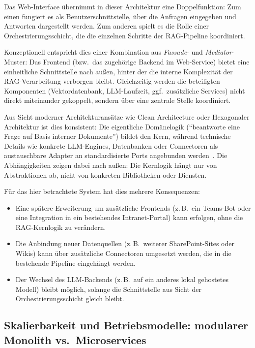Das Web-Interface übernimmt in dieser Architektur eine Doppelfunktion:
Zum einen fungiert es als Benutzerschnittstelle, über die Anfragen eingegeben und Antworten dargestellt werden.
Zum anderen spielt es die Rolle einer Orchestrierungsschicht, die die einzelnen Schritte der RAG-Pipeline koordiniert.

Konzeptionell entspricht dies einer Kombination aus \emph{Fassade}- und \emph{Mediator}-Muster:
Das Frontend (bzw.\ das zugehörige Backend im Web-Service) bietet eine einheitliche Schnittstelle nach außen, hinter der die interne Komplexität der RAG-Verarbeitung verborgen bleibt.
Gleichzeitig werden die beteiligten Komponenten (Vektordatenbank, LLM-Laufzeit, ggf.\ zusätzliche Services) nicht direkt miteinander gekoppelt, sondern über eine zentrale Stelle koordiniert.

Aus Sicht moderner Architekturansätze wie Clean Architecture oder Hexagonaler Architektur ist dies konsistent:
Die eigentliche Domänelogik (\enquote{beantworte eine Frage auf Basis interner Dokumente}) bildet den Kern, während technische Details wie konkrete LLM-Engines, Datenbanken oder Connectoren als austauschbare Adapter an standardisierte Ports angebunden werden~\cite{Martin2012CleanArchitecture,Khadapkar2025Hexagonal}.
Die Abhängigkeiten zeigen dabei nach außen: Die Kernlogik hängt nur von Abstraktionen ab, nicht von konkreten Bibliotheken oder Diensten.

Für das hier betrachtete System hat dies mehrere Konsequenzen:

\begin{itemize}
    \item Eine spätere Erweiterung um zusätzliche Frontends (z.\,B.\ ein Teams-Bot oder eine Integration in ein bestehendes Intranet-Portal) kann erfolgen, ohne die RAG-Kernlogik zu verändern.
    \item Die Anbindung neuer Datenquellen (z.\,B.\ weiterer SharePoint-Sites oder Wikis) kann über zusätzliche Connectoren umgesetzt werden, die in die bestehende Pipeline eingehängt werden.
    \item Der Wechsel des LLM-Backends (z.\,B.\ auf ein anderes lokal gehostetes Modell) bleibt möglich, solange die Schnittstelle aus Sicht der Orchestrierungsschicht gleich bleibt.
\end{itemize}

\subsection{Skalierbarkeit und Betriebsmodelle: modularer Monolith vs.\ Microservices}\label{subsec:skalierbarkeit-und-betriebsmodelle:-modularer-monolith-vs.-microservices}

